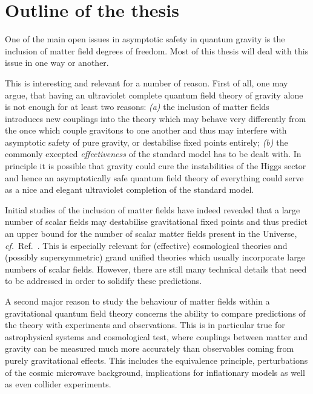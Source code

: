\documentclass[11pt]{book}
\newcommand\cf{\textit{cf.}\ }
\numberwithin{equation}{chapter}
\begin{document}
\section*{Outline of the thesis}

One of the main open issues in asymptotic safety in quantum gravity is
the inclusion of matter field degrees of freedom. Most of this thesis
will deal with this issue in one way or another.

This is interesting and relevant for a number of reason. First of all,
one may argue, that having an ultraviolet complete quantum field theory
of gravity alone is not enough for at least two reasons:
\textit{(a)} the inclusion of matter fields introduces new couplings into
the theory which may behave very differently from the once which couple
gravitons to one another and thus may interfere with asymptotic safety of
pure gravity, or destabilise fixed points entirely;
\textit{(b)} the commonly excepted \textit{effectiveness} of the
standard model has to be dealt with.
In principle it is possible that gravity could cure the instabilities
of the Higgs sector and hence an asymptotically safe quantum
field theory of everything could serve as a nice and elegant ultraviolet completion
of the standard model.

Initial studies of the inclusion of matter fields have indeed revealed that
a large number of scalar fields may destabilise gravitational fixed points
and thus predict an upper bound for the number of scalar matter fields
present in the Universe, \cf Ref.~\cite{Dona:2013qba}. This is especially relevant
for (effective) cosmological theories and (possibly supersymmetric) grand unified
theories which usually incorporate large numbers of scalar fields.
However, there are still many technical details that need to be addressed
in order to solidify these predictions.

A second major reason to study the behaviour of matter fields within a gravitational
quantum field theory concerns the ability to compare predictions of the theory
with experiments and observations. This is in particular true for astrophysical
systems and cosmological test, where couplings between matter and gravity can
be measured much more accurately than observables coming from purely gravitational
effects. This includes the equivalence principle, perturbations of the
cosmic microwave background, implications for inflationary models as well as
even collider experiments.
\end{document}
